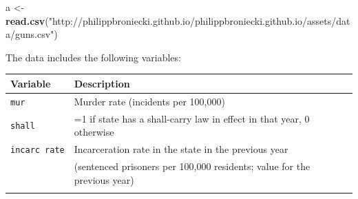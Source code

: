 \documentclass[]{article}
\newenvironment{Shaded}{\begin{snugshade}}{\end{snugshade}}
\newcommand{\KeywordTok}[1]{\textcolor[rgb]{0.13,0.29,0.53}{\textbf{#1}}}
\newcommand{\StringTok}[1]{\textcolor[rgb]{0.31,0.60,0.02}{#1}}
\newcommand{\NormalTok}[1]{#1}
\theoremstyle{definition}
\theoremstyle{definition}
\theoremstyle{definition}
\theoremstyle{remark}
\begin{document}
\begin{Shaded}
\begin{Highlighting}[]
\NormalTok{a <-}\StringTok{ }\KeywordTok{read.csv}\NormalTok{(}\StringTok{"http://philippbroniecki.github.io/philippbroniecki.github.io/assets/data/guns.csv"}\NormalTok{)}
\end{Highlighting}
\end{Shaded}

The data includes the following variables:

\begin{longtable}[]{@{}ll@{}}
\toprule
\begin{minipage}[b]{0.10\columnwidth}\raggedright\strut
Variable\strut
\end{minipage} & \begin{minipage}[b]{0.84\columnwidth}\raggedright\strut
Description\strut
\end{minipage}\tabularnewline
\midrule
\endhead
\begin{minipage}[t]{0.10\columnwidth}\raggedright\strut
\texttt{mur}\strut
\end{minipage} & \begin{minipage}[t]{0.84\columnwidth}\raggedright\strut
Murder rate (incidents per 100,000)\strut
\end{minipage}\tabularnewline
\begin{minipage}[t]{0.10\columnwidth}\raggedright\strut
\texttt{shall}\strut
\end{minipage} & \begin{minipage}[t]{0.84\columnwidth}\raggedright\strut
=1 if state has a shall-carry law in effect in that year, 0
otherwise\strut
\end{minipage}\tabularnewline
\begin{minipage}[t]{0.10\columnwidth}\raggedright\strut
\texttt{incarc\ rate}\strut
\end{minipage} & \begin{minipage}[t]{0.84\columnwidth}\raggedright\strut
Incarceration rate in the state in the previous year\strut
\end{minipage}\tabularnewline
\begin{minipage}[t]{0.10\columnwidth}\raggedright\strut
\strut
\end{minipage} & \begin{minipage}[t]{0.84\columnwidth}\raggedright\strut
(sentenced prisoners per 100,000 residents; value for the previous
year)\strut
\end{minipage}\tabularnewline
\begin{minipage}[t]{0.10\columnwidth}\raggedright\strut

\end{minipage}
\end{longtable}
\end{document}
